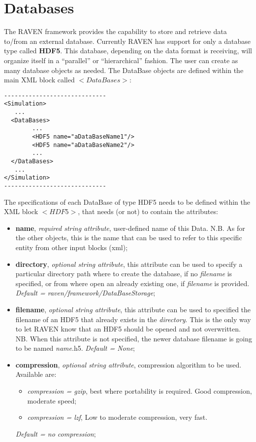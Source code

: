 \section{Databases}
\label{sec:Databases}
The RAVEN framework provides the capability to store and retrieve data to/from an external database. Currently RAVEN has support for only a database type called \textbf{HDF5}. This database, depending on the data format is receiving, will organize itself in a ``parallel'' or ``hierarchical'' fashion. The user can create as many database objects as needed.
The DataBase objects are defined  within the main XML block called $<DataBases>$:
\begin{lstlisting}[style=XML]
-----------------------------
<Simulation>
   ...
  <DataBases>
        ...
        <HDF5 name="aDataBaseName1"/>
        <HDF5 name="aDataBaseName2"/>
        ...
  </DataBases>
   ...
</Simulation>
-----------------------------
\end{lstlisting}
The specifications of each DataBase of type HDF5 needs to be defined within the XML block $<HDF5>$, that  needs (or not) to contain  the attributes:
\vspace{-5mm}
\begin{itemize}
\itemsep0em
\item \textbf{name}, \textit{required string attribute}, user-defined name of this Data. N.B. As for the other objects, this is the name that can be used to refer to this specific entity from other input blocks (xml);
\item \textbf{directory}, \textit{optional string attribute}, this attribute can be used to specify a particular directory path where to create the database, if no \textit{filename} is specified, or from where open an already existing one, if \textit{filename} is provided. \textit{Default = raven/framework/DataBaseStorage};
\item \textbf{filename}, \textit{optional string attribute}, this attribute can be used to specified the filename of an HDF5 that already exists in the \textit{directory}. This is the only way to let RAVEN know that an HDF5 should be opened and not overwritten. NB. When this attribute is not specified, the newer database filename is going to be named \textit{name}.h5. \textit{Default = None};
\item \textbf{compression}, \textit{optional string attribute}, compression algorithm to be used. Available are:
   \begin{itemize}
      \item \textit{compression = gzip}, best where portability is required. Good compression, moderate speed;
      \item \textit{compression = lzf}, Low to moderate compression, very fast.
   \end{itemize}
  \textit{Default = no compression};
\end{itemize}

